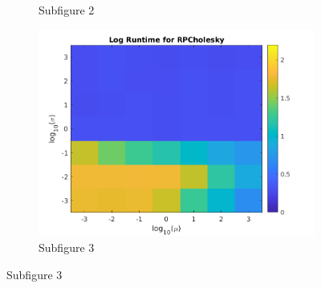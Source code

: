 \documentclass[12pt,letterpaper]{article}
\begin{document}
\begin{enumerate}
\begin{figure}[ht]
\begin{subfigure}[t]{0.3\textwidth}
        \caption{Subfigure 2}
        \label{fig:sub2}
    \end{subfigure}
    \hfill
    \begin{subfigure}[t]{0.3\textwidth}
        \centering
        \includegraphics[width=\textwidth]{plots/rpc1.png}
        \caption{Subfigure 3}
        \label{fig:sub3}
    \end{subfigure}
    

\end{figure}
\end{enumerate}
\end{document}
